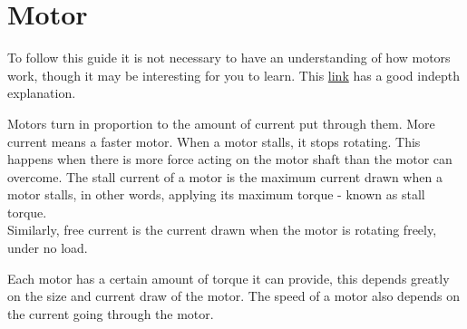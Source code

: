 \documentclass[../TinyBot.tex]{subfiles}
\begin{document}
    
\section{Motor} \label{sec:motor}

To follow this guide it is not necessary to have an understanding of how motors work,
though it may be interesting for you to learn. This \href{https://www.explainthatstuff.com/electricmotors.html}{link}
has a good indepth explanation. 

\bigskip

Motors turn in proportion to the amount of current put through them. More current means a faster motor. 
When a motor stalls, it stops rotating. This happens when there is more force acting on the motor shaft
than the motor can overcome. The stall current of a motor is the maximum current drawn when a motor stalls,
in other words, applying its maximum torque - known as stall torque. \\

Similarly, free current is the current drawn when the motor is rotating freely, under no load. 

\bigskip


Each motor has a certain amount of torque it can provide, this depends greatly on the size and current draw of the motor. The speed of a motor also depends on the current going through the motor. 

\end{document}
